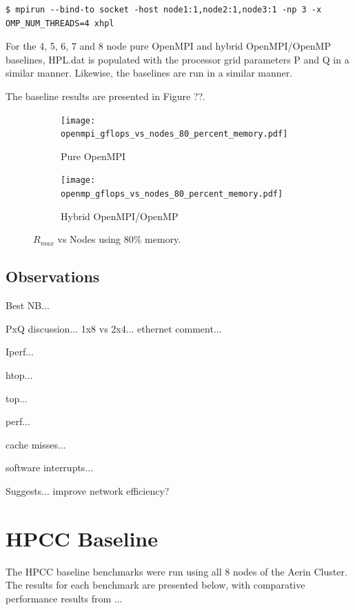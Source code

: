 \documentclass{report}
\begin{document}
\lstset{style=type}
\begin{lstlisting}[]
$ mpirun --bind-to socket -host node1:1,node2:1,node3:1 -np 3 -x OMP_NUM_THREADS=4 xhpl
\end{lstlisting}

For the 4, 5, 6, 7 and 8 node pure OpenMPI and hybrid OpenMPI/OpenMP baselines, HPL.dat is populated with the processor grid parameters P and Q in a similar manner. Likewise, the baselines are run in a similar manner.

The baseline results are presented in Figure ??.

\begin{figure}[H]
	\begin{subfigure}{1.0\textwidth}
		\centering
		\texttt{[image: openmpi\_gflops\_vs\_nodes\_80\_percent\_memory.pdf]}
		\caption{Pure OpenMPI}
		\label{fig:subim1}
	\end{subfigure}
	\par\bigskip
	\begin{subfigure}{1.0\textwidth}
		\centering
		\texttt{[image: openmp\_gflops\_vs\_nodes\_80\_percent\_memory.pdf]}
		\caption{Hybrid OpenMPI/OpenMP}
		\label{fig:subim2}
	\end{subfigure}
\caption{$R_{max}$ vs Nodes using 80\% memory.}
\label{fig:image2}
\end{figure}


%
%
\subsection{Observations}

Best NB...

PxQ discussion... 1x8 vs 2x4... ethernet comment...

Iperf...

htop...

top...

perf...

cache misses...

software interrupts...

Suggests... improve network efficiency?



%
%
\section{HPCC Baseline}

The HPCC baseline benchmarks were run using all 8 nodes of the Aerin Cluster. The results for each benchmark are presented below, with comparative performance results from ...
\end{document}
